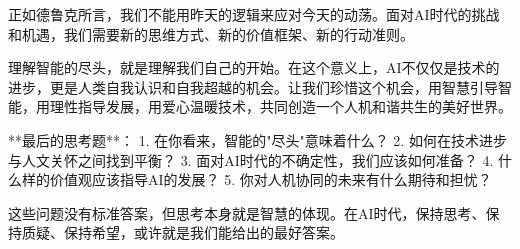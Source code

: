 正如德鲁克所言，我们不能用昨天的逻辑来应对今天的动荡。面对AI时代的挑战和机遇，我们需要新的思维方式、新的价值框架、新的行动准则。

理解智能的尽头，就是理解我们自己的开始。在这个意义上，AI不仅仅是技术的进步，更是人类自我认识和自我超越的机会。让我们珍惜这个机会，用智慧引导智能，用理性指导发展，用爱心温暖技术，共同创造一个人机和谐共生的美好世界。

**最后的思考题**：
1. 在你看来，智能的"尽头"意味着什么？
2. 如何在技术进步与人文关怀之间找到平衡？
3. 面对AI时代的不确定性，我们应该如何准备？
4. 什么样的价值观应该指导AI的发展？
5. 你对人机协同的未来有什么期待和担忧？

这些问题没有标准答案，但思考本身就是智慧的体现。在AI时代，保持思考、保持质疑、保持希望，或许就是我们能给出的最好答案。


\nocite{*}
